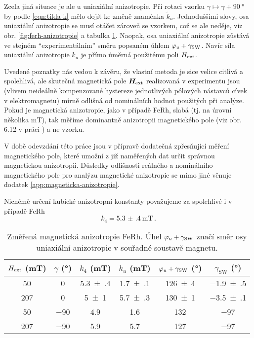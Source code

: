 Zcela jiná situace je ale u uniaxiální anizotropie.
Při rotaci vzorku $\gamma \mapsto\gamma+\SI{90}{\degree}$ by podle \eqref{eqn:tilda-k} mělo dojít ke změně znaménka $\tilde{k}_u$.
Jednoduššími slovy, osa uniaxiální anizotropie se musí otáčet zároveň se vzorkem, což se ale neděje, viz obr. \ref{fig:ferh-anizotropie} a tabulka \ref{tab:ferh-anizotropie}.
Naopak, osa uniaxiální anizotropie zůstává ve stejném ``experimentálním'' směru popsaném úhlem $\varphi_u+\gamma_\textrm{SW}$.
Navíc síla uniaxiální anizotropie $k_u$ je přímo úměrná použitému poli $H_\textrm{ext}$.

Uvedené poznatky nás vedou k závěru, že vlastní metoda je sice velice citlivá a spolehlivá, ale skutečná magnetická pole $\bm{H}_\textrm{ext}$ realizovaná v experimentu jsou (vlivem neideálně kompenzované hystereze jednotlivých pólových nástavců cívek v elektromagnetu) mírně odlišná od nominálních hodnot použitých při analýze.
Pokud je magnetická anizotropie, jako v případě FeRh, slabá (tj. na úrovni několika \si{\milli\tesla}), tak měříme dominantně anizotropii magnetického pole (viz obr. 6.12 v práci \cite{kimakOptickaSpektroskopieAntiferomagnetu2019}) a ne vzorku.

V době odevzdání této práce jsou v přípravě dodatečná zpřesňující měření magnetického pole, které umožní z již naměřených dat určit správnou magnetickou anizotropii.
Důsledky odlišnosti reálného a nominálního magnetického pole pro analýzu magnetické anizotropie se mimo jiné věnuje dodatek \ref{app:magneticka-anizotropie}.

Nicnémě určení kubické anizotropní konstanty považujeme za spolehlivé i v případě FeRh
\begin{equation}
    k_4=\SI{5.3(4)}{\milli\tesla} \,.
\end{equation}

\begin{table}[tp]
    \centering
    \begin{tabular}{cc|cccc}
        \toprule
        $H_\textrm{ext}$ (\si{\milli\tesla}) & $\gamma$ (\si{\degree}) & $k_4$ (\si{\milli\tesla}) & $k_u$ (\si{\milli\tesla}) & $\varphi_u+\gamma_\textrm{SW}$ (\si{\degree}) & $\gamma_\textrm{SW}$ (\si{\degree}) \\ \midrule[\heavyrulewidth]
        50 & 0 & \num{5.3(4)} & \num{1.7(1)} & \num{126(4)} & \num{-1.9(5)} \\
        207 & 0 & \num{5(1)} & \num{5.7(3)} & \num{130(1)} & \num{-3.5(1)} \\ \midrule[\heavyrulewidth]
        50 & \num{-90} & \num{4.9} & \num{1.6} & \num{132} & \num{-97} \\
        207 & \num{-90} & \num{5.9} & \num{5.7} & \num{127} & \num{-97} \\
        \bottomrule 
    \end{tabular} 
    \caption{Změřená magnetická anizotropie FeRh. Úhel $\varphi_u+\gamma_\textrm{SW}$ značí směr osy uniaxiální anizotropie v souřadné soustavě magnetu.}
    \label{tab:ferh-anizotropie}
\end{table}


